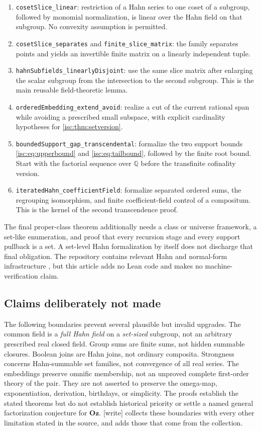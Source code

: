 \documentclass[11pt,letterpaper]{article}
\theoremstyle{definition}
\theoremstyle{remark}
\newcommand{\Oz}{\mathbf{Oz}}
\newcommand{\Q}{\mathbb Q}
\newcommand{\wtag}{\textup{[write]}}%
\numberwithin{equation}{section}
\begin{document}
\begin{enumerate}[label=\textup{(\arabic*)}]
\item \texttt{cosetSlice\_linear}: restriction of a Hahn series to one
coset of a subgroup, followed by monomial normalization, is linear over the
Hahn field on that subgroup. No convexity assumption is permitted.
\item \texttt{cosetSlice\_separates} and
\texttt{finite\_slice\_matrix}: the family separates points and yields an
invertible finite matrix on a linearly independent tuple.
\item \texttt{hahnSubfields\_linearlyDisjoint}: use the same slice matrix
after enlarging the scalar subgroup from the intersection to the second
subgroup. This is the main reusable field-theoretic lemma.
\item \texttt{orderedEmbedding\_extend\_avoid}: realize a cut of the current
rational span while avoiding a prescribed small subspace, with explicit
cardinality hypotheses for \cref{isc:thm:setversion}.
\item \texttt{boundedSupport\_gap\_transcendental}: formalize the two support
bounds \eqref{isc:eq:upperbound} and \eqref{isc:eq:tailbound}, followed by the
finite root bound. Start with the factorial sequence over $\Q$ before the
transfinite cofinality version.
\item \texttt{iteratedHahn\_coefficientField}: formalize separated ordered
sums, the regrouping isomorphism, and finite coefficient-field control of a
compositum. This is the kernel of the second transcendence proof.
\end{enumerate}

The final proper-class theorem additionally needs a class or universe
framework, a set-like enumeration, and proof that every recursion stage and
every support pullback is a set. A set-level Hahn formalization by itself
does not discharge that final obligation. The repository contains relevant
Hahn and normal-form infrastructure \cite{RepoCatalogue}, but this article
adds no Lean code and makes no machine-verification claim.

\subsection{Claims deliberately not made}\label{isc:sub:notmade}

The following boundaries prevent several plausible but invalid upgrades.
The common field is a \emph{full Hahn field} on a \emph{set-sized} subgroup,
not an arbitrary prescribed real closed field. Group sums are finite sums,
not hidden summable closures. Boolean joins are Hahn joins, not ordinary
composita. Strongness concerns Hahn-summable set families, not convergence
of all real series. The embeddings preserve omnific membership, not an
unproved complete first-order theory of the pair. They are not asserted to
preserve the omega-map, exponentiation, derivation, birthdays, or simplicity.
The proofs establish the stated theorems but do not establish historical
priority or settle a named general factorization conjecture for $\Oz$.
\wtag{}  collects these boundaries with every other
limitation stated in the source, and adds those that come from the
collection.
\end{document}
